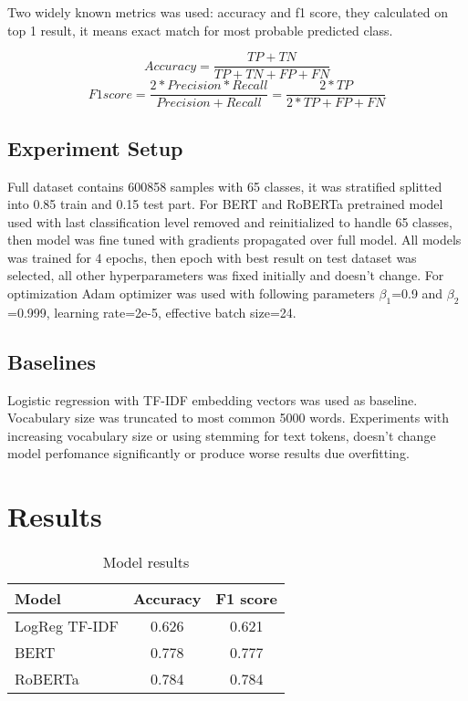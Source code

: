 \documentclass{article}
\begin{document}
Two widely known metrics was used: accuracy and f1 score, they calculated on top 1 result, it means exact match for most probable predicted class.

\[
Accuracy = \frac{TP+TN}{TP+TN+FP+FN}
\]
\[
F1 score = \frac{2*Precision*Recall}{Precision+Recall} = \frac{2*TP}{2*TP+FP+FN}
\]

\subsection{Experiment Setup}

Full dataset contains 600858 samples with 65 classes, it was stratified splitted into 0.85 train and 0.15 test part. For BERT and RoBERTa pretrained model used with last classification level removed and reinitialized to handle 65 classes, then model was fine tuned with gradients propagated over full model. All models was trained for 4 epochs, then epoch with best result on test dataset was selected, all other hyperparameters was fixed initially and doesn't change. 
For optimization Adam optimizer was used with following parameters $\beta_{1}$=0.9 and $\beta_{2}$=0.999, learning rate=2e-5, effective batch size=24. 


\subsection{Baselines}

Logistic regression with TF-IDF embedding vectors was used as baseline. Vocabulary size was truncated to most common 5000 words. Experiments with increasing vocabulary size or using stemming for text tokens, doesn't change model perfomance significantly or produce worse results due overfitting.

\section{Results}

\begin{table}[!tbh]
    \centering
    \begin{tabular}{|l|c|c|}
\hline
Model & Accuracy & F1 score \\
\hline
LogReg TF-IDF & 0.626 & 0.621 \\
BERT & 0.778 & 0.777 \\
RoBERTa & 0.784 & 0.784 \\
\hline
    \end{tabular}
    \caption{Model results}
    \label{tab:results}
\end{table}
\end{document}
